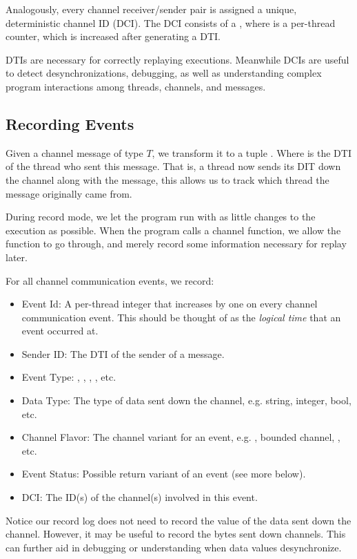 Analogously, every channel receiver/sender pair is assigned a unique, deterministic channel ID (DCI). The DCI consists of a , where  is a per-thread
counter, which is increased after generating a DTI.

DTIs are necessary for correctly replaying executions. Meanwhile DCIs are useful to detect
desynchronizations, debugging, as well as understanding complex program interactions among
threads, channels, and messages.

\subsection{Recording Events}
Given a channel message of type $T$, we transform it to a tuple . Where  is
the DTI of the thread who sent this message. That is, a thread now sends its DIT down
the channel along with the message, this allows us to track which thread the message
originally came from.

During record mode, we let the program run with as little changes to the execution as
possible. When the program calls a channel function, we allow the function to go through, and merely record some information necessary for replay later.

For all channel communication events, we record:
\begin{itemize}
\item Event Id: A per-thread integer that increases by one on every channel communication
  event. This should be thought of as the \textit{logical time} that an event occurred at.
\item Sender ID: The DTI of the sender of a message.
\item Event Type: , , , , etc.
\item Data Type: The type of data sent down the channel, e.g. string, integer, bool, etc.
\item Channel Flavor: The channel variant for an event, e.g. , bounded channel,
  , etc.
\item Event Status: Possible return variant of an event (see more below).
\item DCI: The ID(s) of the channel(s) involved in this event.
\end{itemize}
Notice our record log does not need to record the value of the data sent down the channel. However, it may be useful to record the bytes sent down channels. This can further aid in debugging or understanding when data values desynchronize.


